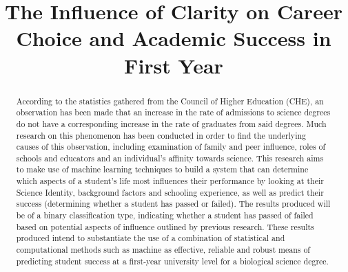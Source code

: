 \documentclass[conference]{IEEEtran}
\begin{document}
\title{The Influence of Clarity on Career Choice and Academic Success in First Year\\
}

\author{
\and
{}
\and
{}
}

\maketitle

\begin{abstract}
According to the statistics gathered from the Council of Higher Education (CHE), an observation has been made that an increase in the rate of admissions to science degrees do not have a corresponding increase in the rate of graduates from said degrees. Much research on this phenomenon has been conducted in order to find the underlying causes of this observation, including examination of family and peer influence, roles of schools and educators and an individual's affinity towards science. This research aims to make use of machine learning techniques to build a system that can determine which aspects of a student's life most influences their performance by looking at their Science Identity, background factors and schooling experience, as well as predict their success (determining whether a student has passed or failed). The results produced will be of a binary classification type, indicating whether a student has passed of failed based on potential aspects of influence outlined by previous research. These results produced intend to substantiate the use of a combination of statistical and computational methods such as machine as effective, reliable and robust means of predicting student success at a first-year university level for a biological science degree.
\end{abstract}
\end{document}

